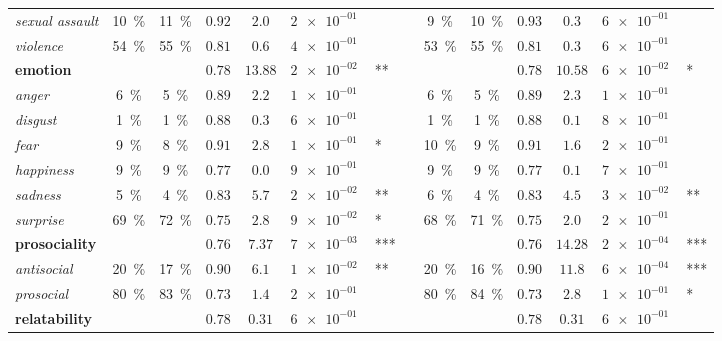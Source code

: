 \begin{tabular}{lccccr@{\hskip0pt}llccccr@{\hskip0pt}l}
\textit{sexual assault} & \SI{10}{\percent} & \SI{11}{\percent} & $0.92$ & $2.0$ & $\SI{2e-01}{}$ &  && \SI{9}{\percent} & \SI{10}{\percent} & $0.93$ & $0.3$ & $\SI{6e-01}{}$ &  \\
\textit{violence} & \SI{54}{\percent} & \SI{55}{\percent} & $0.81$ & $0.6$ & $\SI{4e-01}{}$ &  && \SI{53}{\percent} & \SI{55}{\percent} & $0.81$ & $0.3$ & $\SI{6e-01}{}$ &  \\
\midrule\textbf{emotion} & & & $0.78$ & $13.88$ & $\SI{2e-02}{}$ & ** && & & $0.78$ & $10.58$ & $\SI{6e-02}{}$ & * \\
\textit{anger} & \SI{6}{\percent} & \SI{5}{\percent} & $0.89$ & $2.2$ & $\SI{1e-01}{}$ &  && \SI{6}{\percent} & \SI{5}{\percent} & $0.89$ & $2.3$ & $\SI{1e-01}{}$ &  \\
\textit{disgust} & \SI{1}{\percent} & \SI{1}{\percent} & $0.88$ & $0.3$ & $\SI{6e-01}{}$ &  && \SI{1}{\percent} & \SI{1}{\percent} & $0.88$ & $0.1$ & $\SI{8e-01}{}$ &  \\
\textit{fear} & \SI{9}{\percent} & \SI{8}{\percent} & $0.91$ & $2.8$ & $\SI{1e-01}{}$ & * && \SI{10}{\percent} & \SI{9}{\percent} & $0.91$ & $1.6$ & $\SI{2e-01}{}$ &  \\
\textit{happiness} & \SI{9}{\percent} & \SI{9}{\percent} & $0.77$ & $0.0$ & $\SI{9e-01}{}$ &  && \SI{9}{\percent} & \SI{9}{\percent} & $0.77$ & $0.1$ & $\SI{7e-01}{}$ &  \\
\textit{sadness} & \SI{5}{\percent} & \SI{4}{\percent} & $0.83$ & $5.7$ & $\SI{2e-02}{}$ & ** && \SI{6}{\percent} & \SI{4}{\percent} & $0.83$ & $4.5$ & $\SI{3e-02}{}$ & ** \\
\textit{surprise} & \SI{69}{\percent} & \SI{72}{\percent} & $0.75$ & $2.8$ & $\SI{9e-02}{}$ & * && \SI{68}{\percent} & \SI{71}{\percent} & $0.75$ & $2.0$ & $\SI{2e-01}{}$ &  \\
\midrule\textbf{prosociality} & & & $0.76$ & $7.37$ & $\SI{7e-03}{}$ & *** && & & $0.76$ & $14.28$ & $\SI{2e-04}{}$ & *** \\
\textit{antisocial} & \SI{20}{\percent} & \SI{17}{\percent} & $0.90$ & $6.1$ & $\SI{1e-02}{}$ & ** && \SI{20}{\percent} & \SI{16}{\percent} & $0.90$ & $11.8$ & $\SI{6e-04}{}$ & *** \\
\textit{prosocial} & \SI{80}{\percent} & \SI{83}{\percent} & $0.73$ & $1.4$ & $\SI{2e-01}{}$ &  && \SI{80}{\percent} & \SI{84}{\percent} & $0.73$ & $2.8$ & $\SI{1e-01}{}$ & * \\
\midrule\textbf{relatability} & & & $0.78$ & $0.31$ & $\SI{6e-01}{}$ &  && & & $0.78$ & $0.31$ & $\SI{6e-01}{}$ &  \\

\end{tabular}
